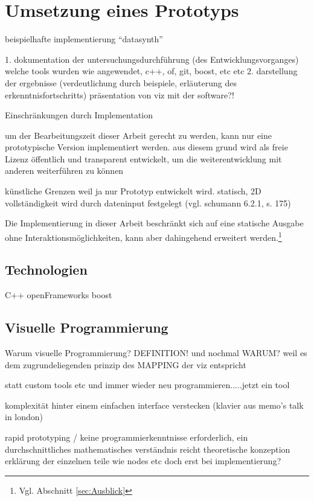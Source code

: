 \documentclass[a4paper, 12pt, DIVcalc, onepage, pdftex, headsepline, footsepline]{scrreprt}
\begin{document}
\chapter{Umsetzung eines Prototyps}
\label{cha:Umsetzung}

beispielhafte implementierung “datasynth”

1. dokumentation der untersuchungsdurchführung (des Entwicklungsvorganges)
welche tools wurden wie angewendet, c++, of, git, boost, etc etc
2. darstellung der ergebnisse (verdeutlichung durch beispiele, erläuterung des erkenntnisfortschritts)
präsentation von viz mit der software?!

Einschränkungen durch Implementation

um der Bearbeitungszeit dieser Arbeit gerecht zu werden, kann nur eine prototypische Version implementiert werden.
aus diesem grund wird als freie Lizenz  öffentlich und transparent entwickelt, um die weiterentwicklung mit anderen weiterführen zu können


künstliche Grenzen weil ja nur Prototyp entwickelt wird.
statisch, 2D vollständigkeit wird durch dateninput festgelegt (vgl. schumann 6.2.1, s. 175)

Die Implementierung in dieser Arbeit beschränkt sich auf eine statische Ausgabe ohne Interaktionsmöglichkeiten,
kann aber dahingehend erweitert werden.\footnote{Vgl. Abschnitt \ref{sec:Ausblick}}

\section{Technologien}
\label{sec:Technologien}
C++
openFrameworks
boost
\section{Visuelle Programmierung}
\label{sec:visPro}

Warum visuelle Programmierung? DEFINITION! und nochmal WARUM?
weil es dem zugrundeliegenden prinzip des MAPPING der viz entspricht

statt custom tools etc und immer wieder neu programmieren.....jetzt ein tool

komplexität hinter einem einfachen interface verstecken (klavier aus memo’s talk in london)


rapid prototyping / keine programmierkenntnisse erforderlich, ein durchschnittliches mathematisches verständnis reicht
theoretische konzeption
erklärung der einzelnen teile wie nodes etc doch erst bei implementierung?
\end{document}
